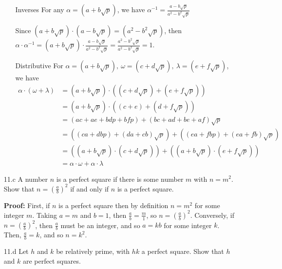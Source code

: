 \documentclass[letterpaper]{article}
\begin{document}
\begin{itemize}
\begin{itemize}
                  \item[Inverses] For any \(\alpha = (a + b\sqrt{p})\), we have \(\alpha^{-1} = \frac{a - b\sqrt{p}}{a^2 - b^2\sqrt{p}}\)

                        Since \((a + b\sqrt{p}) \cdot (a - b\sqrt{p}) = (a^2 - b^2\sqrt{p})\), then \(\alpha \cdot \alpha^{-1} = (a + b\sqrt{p})\cdot \frac{a - b\sqrt{p}}{a^2 - b^2\sqrt{p}} = \frac{a^2 - b^2\sqrt{p}}{a^2 - b^2\sqrt{p}} = 1\).
                  \item[Distributive] For \(\alpha = (a + b\sqrt{p}),\ \omega = (c + d\sqrt{p}),\ \lambda = (e + f\sqrt{p})\), we have
                        \begin{align*}
                              \alpha \cdot (\omega + \lambda) & = (a + b\sqrt{p}) \cdot((c + d\sqrt{p}) + (e + f\sqrt{p}))
                              \\&= (a + b\sqrt{p}) \cdot ((c + e) + (d + f\sqrt{p}))                                            \\ &= (a c + a e + b d p + b f p) + (b c  + a d + b e + a f )\sqrt{p}
                              \\& = ((ca + dbp) + (da + cb)\sqrt{p}) + ((ea + fbp) + (ea + fb)\sqrt{p})
                              \\&= ((a + b\sqrt{p}) \cdot (c + d\sqrt{p})) + ((a + b\sqrt{p})\cdot (e + f\sqrt{p}))
                              \\&= \alpha \cdot \omega + \alpha \cdot \lambda
                        \end{align*}
            \end{itemize}

      \item[11.c] A number \(n\) is a perfect square if there is some number \(m\) with \(n = m^2\). Show that \(n = (\frac{a}{b})^2\) if and only if \(n\) is a perfect square.

            \textbf{Proof: } First, if \(n\) is a perfect square then by definition \(n = m^2\) for some integer \(m\). Taking \(a = m\) and \(b = 1\), then \(\frac{a}{b} = \frac{m}{1}\), so \(n = (\frac{a}{b})^2\).
            Conversely, if \(n = {(\frac{a}{b})}^2\), then \(\frac{a}{b}\) must be an integer, and so \(a = kb\) for some integer \(k\). Then, \(\frac{a}{b} = k\), and so \(n = k^2\).

      \item[11.d] Let \(h\) and \(k\) be relatively prime, with \(hk\) a perfect square. Show that \(h\) and \(k\) are perfect squares.


\end{itemize}
\end{document}
